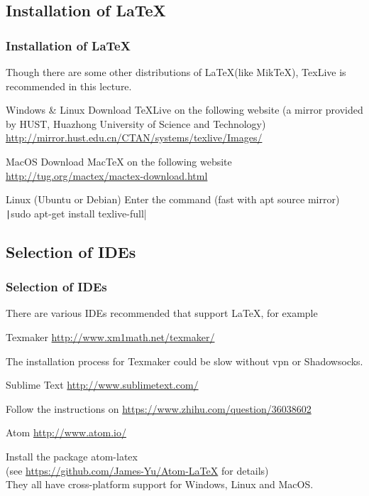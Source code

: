 \subsection{Installation of \LaTeX}
\begin{frame}
	\frametitle{Installation of \LaTeX}
	Though there are some other distributions of \LaTeX (like MikTeX), TexLive is recommended in this lecture.
	\begin{block}{Windows \& Linux}
		Download TeXLive on the following website (a mirror provided by HUST, Huazhong University of Science and Technology) \\
		\url{http://mirror.hust.edu.cn/CTAN/systems/texlive/Images/}
	\end{block}
	\begin{block}{MacOS}
		Download MacTeX on the following website\\
		\url{http://tug.org/mactex/mactex-download.html}
	\end{block}
	\begin{block}{Linux (Ubuntu or Debian)}
		Enter the command (fast with apt source mirror) \\
		\texttt|sudo apt-get install texlive-full|
	\end{block}
\end{frame}

\subsection{Selection of IDEs}

\begin{frame}
	\frametitle{Selection of IDEs}
	\small
	There are various IDEs recommended that support \LaTeX , for example
	\begin{block}{Texmaker}
		\url{http://www.xm1math.net/texmaker/}
	\end{block}
	The installation process for Texmaker could be slow without vpn or Shadowsocks. 
	\begin{block}{Sublime Text}
		\url{http://www.sublimetext.com/} \\[0.5em]
	\end{block}
	Follow the instructions on \url{https://www.zhihu.com/question/36038602}
	\begin{block}{Atom}
		\url{http://www.atom.io/} \\[0.5em]
	\end{block}
	Install the package \alert{atom-latex} 
	\\(see \url{https://github.com/James-Yu/Atom-LaTeX} for details)
	\\They all have cross-platform support for Windows, Linux and MacOS.
\end{frame}

